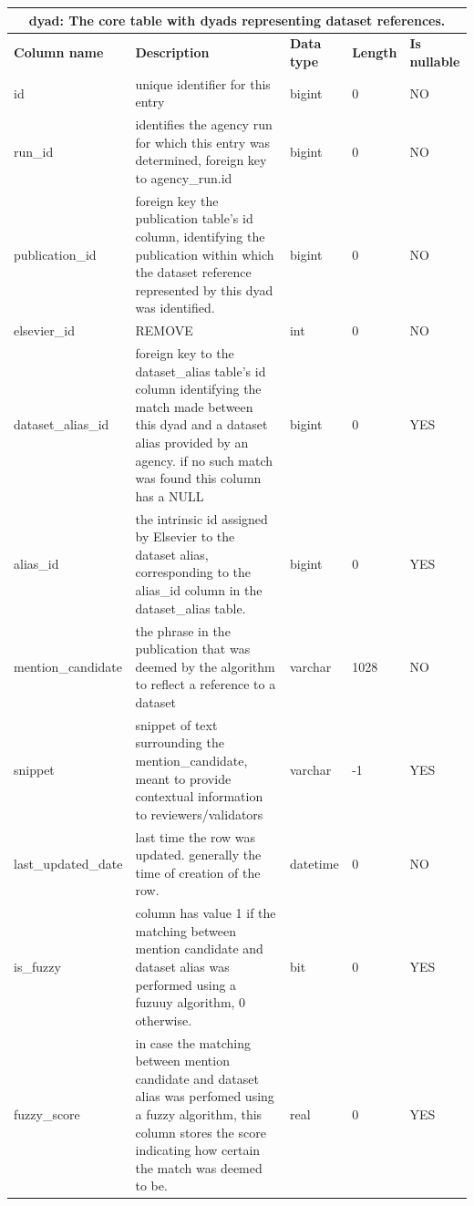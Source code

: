 \documentclass[titlepage, 11pt]{article}
\begin{document}
{\begin{table}[h!]
{\renewcommand{\arraystretch}{1.2}%
\begin{tabularx}{1\textwidth} {|p{3cm}|p{6.33cm}|p{2cm}|p{1.5cm}|p{1.5cm}|}
 \hline
 \multicolumn{5}{|c|}{\textbf{dyad: The core table with dyads representing dataset references.}}\\
 \hline
 \textbf{Column name} & \textbf{Description} & \textbf{Data type} & \textbf{Length} & \textbf{Is nullable} \\
 \hline
 id & unique identifier for this entry & bigint & 0 & NO \\
 \hline
 run\_id &
  identifies the agency run for which this entry was determined, foreign key to agency\_run.id &
  bigint &
  0 &
  NO \\
  \hline
 publication\_id &
  foreign key the publication table's id column, identifying the publication within which the dataset reference represented by this dyad was identified. &
  bigint &
  0 &
  NO \\
  \hline
  elsevier\_id &
  REMOVE &
  int &
  0 &
  NO \\
  \hline
  dataset\_alias\_id &
  foreign key to the dataset\_alias table's id column identifying the match made between this dyad and a dataset alias provided by an agency. if no such match was found this column has a NULL &
  bigint &
  0 &
  YES \\
  \hline
 alias\_id &
  the intrinsic id assigned by Elsevier to the dataset alias, corresponding to the alias\_id column in the dataset\_alias table. &
  bigint &
  0 &
  YES \\
  \hline
  mention\_candidate &
  the phrase in the publication that was deemed by the algorithm to reflect a reference to a dataset &
  varchar &
  1028 &
  NO \\
  \hline
  snippet &
  snippet of text surrounding the mention\_candidate, meant to provide contextual information to reviewers/validators &
  varchar &
  -1 &
  YES \\
  \hline
  last\_updated\_date &
  last time the row was updated. generally the time of creation of the row. &
  datetime &
  0 &
  NO \\
  \hline
 is\_fuzzy &
  column has value 1 if the matching between mention candidate and dataset alias was performed using a fuzuuy algorithm, 0 otherwise. &
  bit &
  0 &
  YES \\
\hline
fuzzy\_score & 
in case the matching between mention candidate and dataset alias was perfomed using a fuzzy algorithm, this column stores the score indicating how certain the match was deemed to be. &
real &
0 &
YES \\
\hline


\end{tabularx}}
\end{table}}
\end{document}
